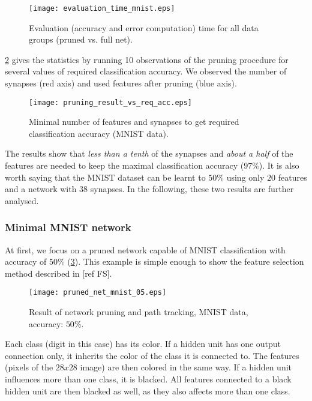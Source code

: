 \begin{figure}[H]
\centering
\texttt{[image: evaluation\_time\_mnist.eps]}
\caption{Evaluation (accuracy and error computation) time for all data groups (pruned vs. full net).}
\label{fig:examples:evaluation_time_mnist}
\end{figure}

 \cref{fig:examples:mnist_pruning_vs_req_acc} gives the statistics by running 10 observations of the pruning procedure for several values of required classification accuracy. We observed the number of synapses (red axis) and used features after pruning (blue axis).

\begin{figure}[H]
\centering
\texttt{[image: pruning\_result\_vs\_req\_acc.eps]}
\caption{Minimal number of features and synapses to get required classification accuracy (MNIST data).}
\label{fig:examples:mnist_pruning_vs_req_acc}
\end{figure}

The results show that \textit{less than a tenth} of the synapses and \textit{about a half} of the features are needed to keep the maximal classification accuracy ($ 97\% $). It is also worth saying that the MNIST dataset can be learnt to $ 50\% $ using only $ 20 $ features and a network with $ 38 $ synapses. In the following, these two results are further analysed.

\subsubsection*{Minimal MNIST network}
At first, we focus on a pruned network capable of MNIST classification with accuracy of $ 50\% $ (\cref{fig:examples:pruned_net_mnist_05}). This example is simple enough to show the feature selection method described in [ref FS].

\begin{figure}[H]
\centering
\texttt{[image: pruned\_net\_mnist\_05.eps]}
\caption{Result of network pruning and path tracking, MNIST data, accuracy: $ 50\% $.}
\label{fig:examples:pruned_net_mnist_05}
\end{figure}

Each class (digit in this case) has its color. If a hidden unit has one output connection only, it inherits the color of the class it is connected to. The features (pixels of the $ 28x28 $ image) are then colored in the same way. If a hidden unit influences more than one class, it is blacked. All features connected to a black hidden unit are then blacked as well, as they also affects more than one class.

